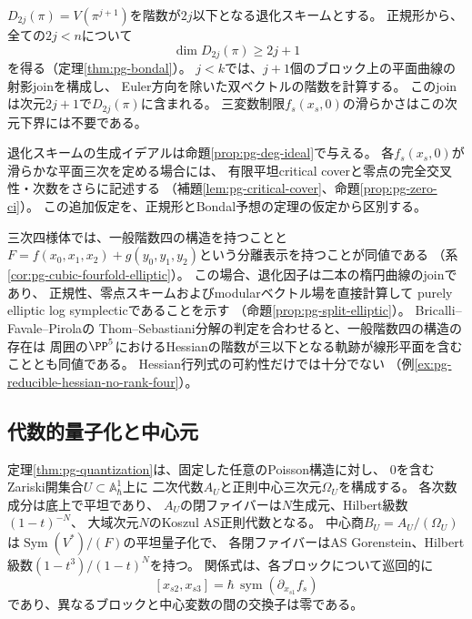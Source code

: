$D_{2j}(\pi)=V(\pi^{j+1})$を階数が$2j$以下となる退化スキームとする。
正規形から、全ての$2j<n$について
\begin{equation}\label{eq:intro-bondal}
 \dim D_{2j}(\pi)\ge2j+1
\end{equation}
を得る（定理\ref{thm:pg-bondal}）。
$j<k$では、$j+1$個のブロック上の平面曲線の射影joinを構成し、
Euler方向を除いた双ベクトルの階数を計算する。
このjoinは次元$2j+1$で$D_{2j}(\pi)$に含まれる。
三変数制限$f_s(x_s,0)$の滑らかさはこの次元下界には不要である。

退化スキームの生成イデアルは命題\ref{prop:pg-deg-ideal}で与える。
各$f_s(x_s,0)$が滑らかな平面三次を定める場合には、
有限平坦critical coverと零点の完全交叉性・次数をさらに記述する
（補題\ref{lem:pg-critical-cover}、命題\ref{prop:pg-zero-ci}）。
この追加仮定を、正規形とBondal予想の定理の仮定から区別する。

三次四様体では、一般階数四の構造を持つことと
$F=f(x_0,x_1,x_2)+g(y_0,y_1,y_2)$という分離表示を持つことが同値である
（系\ref{cor:pg-cubic-fourfold-elliptic}）。
この場合、退化因子は二本の楕円曲線のjoinであり、
正規性、零点スキームおよびmodularベクトル場を直接計算して
purely elliptic log symplecticであることを示す
（命題\ref{prop:pg-split-elliptic}）。
Bricalli--Favale--Pirola\cite[Theorem~3.4]{PBricalliFavalePirola}の
Thom--Sebastiani分解の判定を合わせると、一般階数四の構造の存在は
周囲の$\PP^5$におけるHessianの階数が三以下となる軌跡が線形平面を含むこととも同値である。
Hessian行列式の可約性だけでは十分でない
（例\ref{ex:pg-reducible-hessian-no-rank-four}）。

\subsection*{代数的量子化と中心元}
定理\ref{thm:pg-quantization}は、固定した任意のPoisson構造に対し、
$0$を含むZariski開集合$U\subset\mathbb A^1_\hbar$上に
二次代数$A_U$と正則中心三次元$\Omega_U$を構成する。
各次数成分は底上で平坦であり、
$A_U$の閉ファイバーは$N$生成元、Hilbert級数$(1-t)^{-N}$、
大域次元$N$のKoszul AS正則代数となる。
中心商$B_U=A_U/(\Omega_U)$は$\operatorname{Sym}(V^*)/(F)$の平坦量子化で、
各閉ファイバーはAS Gorenstein、Hilbert級数$(1-t^3)/(1-t)^N$を持つ。
関係式は、各ブロックについて巡回的に
\begin{equation}\label{eq:intro-quantum-relations}
 [x_{s2},x_{s3}]
 =\hbar\,\operatorname{sym}(\partial_{x_{s1}}f_s)
\end{equation}
であり、異なるブロックと中心変数の間の交換子は零である。

